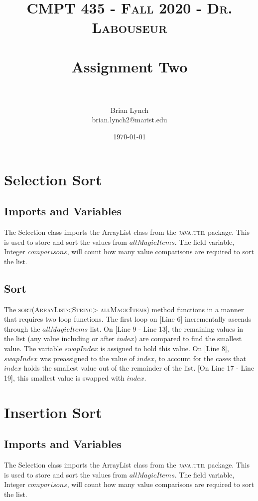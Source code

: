 \documentclass[letterpaper, 10pt,DIV=13]{scrartcl}
\title{	
   \normalfont \normalsize 
   \textsc{CMPT 435 - Fall 2020 - Dr. Labouseur} \\[10pt] %
   \horrule{0.5pt} \\[0.25cm] 	%
   \huge Assignment Two  \\     %
   \horrule{0.5pt} \\[0.25cm] 	%
}
\author{Brian Lynch \\ \normalsize brian.lynch2@marist.edu}
\date{\normalsize\today} %
\begin{document}
\maketitle %



\section{Selection Sort}

\subsection{Imports and Variables}
The Selection class imports the ArrayList class from the \textsc{java.util} package. This is used to store and sort the values from $allMagicItems$. The field variable, Integer $comparisons$, will count how many value comparisons are required to sort the list.

\subsection{Sort}
The \textsc{sort(ArrayList<String> allMagicItems)} method functions in a manner that requires two loop functions. The first loop on [Line 6] incrementally ascends through the $allMagicItems$ list. On [Line 9 - Line 13], the remaining values in the list (any value including or after $index$) are compared to find the smallest value. The variable $swapIndex$ is assigned to hold this value. On [Line 8], $swapIndex$ was preassigned to the value of $index$, to account for the cases that $index$ holds the smallest value out of the remainder of the list. [On Line 17 - Line 19], this smallest value is swapped with $index$.



\section{Insertion Sort}

\subsection{Imports and Variables}
The Selection class imports the ArrayList class from the \textsc{java.util} package. This is used to store and sort the values from $allMagicItems$. The field variable, Integer $comparisons$, will count how many value comparisons are required to sort the list.
\end{document}
